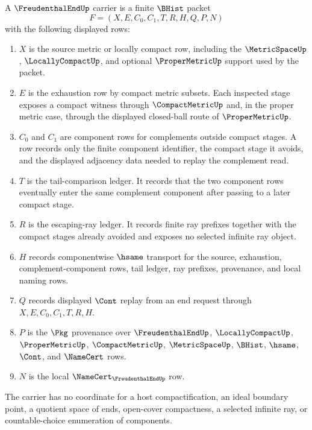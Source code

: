 \begin{definition}
\label{def:freudenthal-end-carrier}
A $\FreudenthalEndUp$ carrier is a finite $\BHist$ packet
$$
F=(X,E,C_0,C_1,T,R,H,Q,P,N)
$$
with the following displayed rows:
\begin{enumerate}
\item $X$ is the source metric or locally compact row, including the $\MetricSpaceUp$, $\LocallyCompactUp$, and optional $\ProperMetricUp$ support used by the packet.
\item $E$ is the exhaustion row by compact metric subsets. Each inspected stage exposes a compact witness through $\CompactMetricUp$ and, in the proper metric case, through the displayed closed-ball route of $\ProperMetricUp$.
\item $C_0$ and $C_1$ are component rows for complements outside compact stages. A row records only the finite component identifier, the compact stage it avoids, and the displayed adjacency data needed to replay the complement read.
\item $T$ is the tail-comparison ledger. It records that the two component rows eventually enter the same complement component after passing to a later compact stage.
\item $R$ is the escaping-ray ledger. It records finite ray prefixes together with the compact stages already avoided and exposes no selected infinite ray object.
\item $H$ records componentwise $\hsame$ transport for the source, exhaustion, complement-component rows, tail ledger, ray prefixes, provenance, and local naming rows.
\item $Q$ records displayed $\Cont$ replay from an end request through $X,E,C_0,C_1,T,R,H$.
\item $P$ is the $\Pkg$ provenance over $\FreudenthalEndUp$, $\LocallyCompactUp$, $\ProperMetricUp$, $\CompactMetricUp$, $\MetricSpaceUp$, $\BHist$, $\hsame$, $\Cont$, and $\NameCert$ rows.
\item $N$ is the local $\NameCert_{\FreudenthalEndUp}$ row.
\end{enumerate}
The carrier has no coordinate for a host compactification, an ideal boundary point, a quotient space of ends, open-cover compactness, a selected infinite ray, or countable-choice enumeration of components.
\end{definition}

